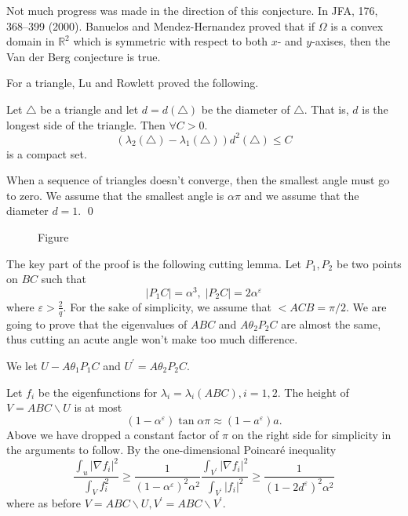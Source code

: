 Not much progress was made in the direction of this conjecture. In JFA, 176, 368--399 (2000). Banuelos and Mendez-Hernandez proved that if $ \Omega  $ is a convex domain in $ \mathbb{R} ^2 $ which is symmetric with respect to both $ x $- and $y$-axises, then the Van der Berg conjecture is true.

For a triangle, Lu and Rowlett proved the following.

\begin{theorem} Let $ \triangle $ be a triangle and let $ d = d (\triangle) $ be the diameter of $ \triangle$. That is, $d$ is the longest side of the triangle. Then $ \forall  C > 0 $.
\[ ( \lambda _2 (\triangle ) - \lambda _1 (\triangle )) d^2 (\triangle ) \leq C \]
%
is a compact set.
\end{theorem}
When a sequence of triangles doesn't converge, then the smallest angle must go to zero. We assume that the smallest angle is $ \alpha \pi$ and we assume that the diameter $ d = 1$. 
\qed


\begin{figure}[h!]
\vspace{0.2in}
\caption{Figure}
\end{figure}

The key part of the proof is the following cutting lemma. Let $ P_1, P_2 $ be two points on $BC$ such that 
%
\[ | P_1 C| = \alpha ^3 , \; |P_2 C |= 2 \alpha ^\varepsilon \]
%
where $ \varepsilon > \frac{2}{q} $. For the sake of simplicity, we assume that $ < A CB = \pi/2$. We are going to prove that the eigenvalues of $ABC$ and $A \theta_2 P_2 C $ are almost the same, thus cutting an acute angle won't make too much difference.

We let $U - A \theta _1 P_1 C $ and $ U^\prime = A \theta _2 P_2 C $.

Let $ f_i$ be the eigenfunctions for $ \lambda _i = \lambda _i (ABC), i = 1, 2$. The height of $ V = ABC \backslash U$ is at most 
%
\[ ( 1 - \alpha ^\varepsilon ) \tan \alpha \pi\approx (1 - a ^\varepsilon ) a .\]
%
Above we have dropped a constant factor of $ \pi$ on the right side for simplicity in the arguments to follow. By the one-dimensional Poincar\'{e} inequality
%
\[\frac{\int _u {|\nabla f_i|^2}}{\int_V f_i^2 } \geq \frac{1}{( 1 - \alpha ^\varepsilon )^2 \alpha ^2} \frac{\int _{V^{\prime}}  |\nabla f_i|^2}{\int_{V^{\prime}} |f_i|^2 } \geq \frac{1}{( 1 - 2 d ^\varepsilon )^2 \alpha ^2}  \]
%
where as before  $ V = ABC\backslash U , V ^\prime = ABC \backslash V^\prime $. 

